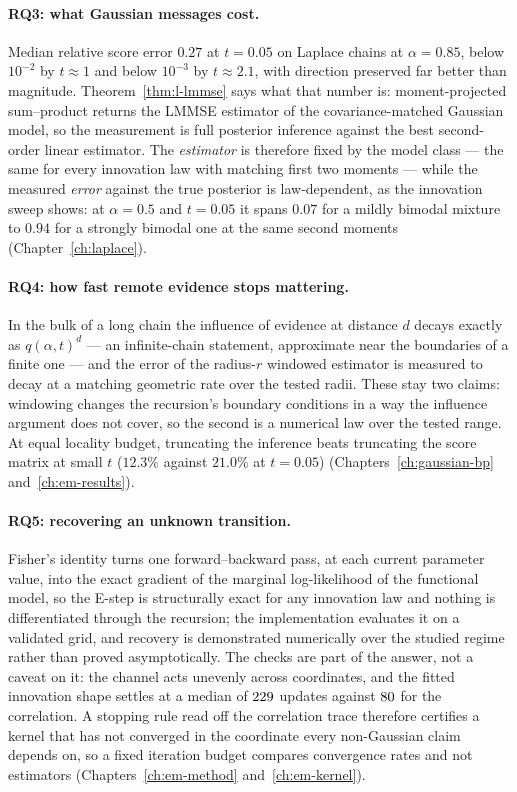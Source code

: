 \paragraph{RQ3: what Gaussian messages cost.} Median relative score error
$0.27$ at $t=0.05$ on Laplace chains at $\alpha = 0.85$, below $10^{-2}$ by
$t \approx 1$ and
below $10^{-3}$ by $t \approx 2.1$, with direction preserved far better than
magnitude. Theorem~\ref{thm:l-lmmse} says what that number is: moment-projected
sum--product returns the LMMSE estimator of the covariance-matched Gaussian
model, so the measurement is full posterior inference against the best
second-order linear estimator. The \emph{estimator} is therefore fixed by the
model class --- the same for every innovation law with matching first two
moments --- while the measured \emph{error} against the true posterior is
law-dependent, as the innovation sweep shows: at $\alpha = 0.5$ and
$t = 0.05$ it spans $0.07$ for a mildly bimodal
mixture to $0.94$ for a strongly bimodal one at the same second moments
(Chapter~\ref{ch:laplace}).

\paragraph{RQ4: how fast remote evidence stops mattering.} In the bulk of a
long chain the influence of
evidence at distance $d$ decays exactly as $q(\alpha,t)^d$ --- an
infinite-chain statement, approximate near the boundaries of a finite one ---
and the error of the
radius-$r$ windowed estimator is measured to decay at a matching geometric
rate over the tested radii. These stay two claims: windowing changes the
recursion's
boundary conditions in a way the influence argument does not cover, so the
second is a numerical law over the tested range. At equal locality budget,
truncating the inference beats truncating the score matrix at small $t$
($12.3\%$ against $21.0\%$ at $t = 0.05$)
(Chapters~\ref{ch:gaussian-bp} and~\ref{ch:em-results}).

\paragraph{RQ5: recovering an unknown transition.} Fisher's identity turns one
forward--backward pass, at each current parameter value, into the exact
gradient of the marginal log-likelihood
of the functional model, so the E-step is structurally exact for any
innovation law and nothing is
differentiated through the recursion; the implementation evaluates it on a
validated grid, and recovery is demonstrated numerically over the studied
regime rather than proved asymptotically. The checks are part of the answer, not a
caveat on it: the channel acts unevenly across coordinates, and the fitted
innovation shape settles at a median of $229$ updates against
$80$ for the correlation. A stopping rule read off the correlation
trace therefore certifies a kernel that has not converged in the coordinate
every non-Gaussian claim depends on, so a fixed iteration budget compares
convergence rates and not estimators
(Chapters~\ref{ch:em-method} and~\ref{ch:em-kernel}).

